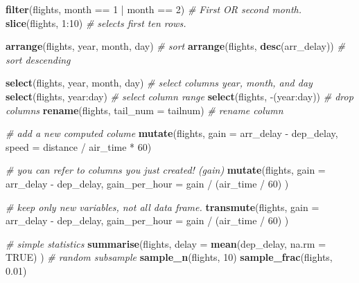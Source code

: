 \documentclass[]{book}
\newenvironment{Shaded}{\begin{snugshade}}{\end{snugshade}}
\newcommand{\KeywordTok}[1]{\textcolor[rgb]{0.13,0.29,0.53}{\textbf{{#1}}}}
\newcommand{\DataTypeTok}[1]{\textcolor[rgb]{0.13,0.29,0.53}{{#1}}}
\newcommand{\DecValTok}[1]{\textcolor[rgb]{0.00,0.00,0.81}{{#1}}}
\newcommand{\FloatTok}[1]{\textcolor[rgb]{0.00,0.00,0.81}{{#1}}}
\newcommand{\StringTok}[1]{\textcolor[rgb]{0.31,0.60,0.02}{{#1}}}
\newcommand{\CommentTok}[1]{\textcolor[rgb]{0.56,0.35,0.01}{\textit{{#1}}}}
\newcommand{\OtherTok}[1]{\textcolor[rgb]{0.56,0.35,0.01}{{#1}}}
\newcommand{\NormalTok}[1]{{#1}}
\theoremstyle{definition}
\theoremstyle{definition}
\theoremstyle{remark}
\begin{document}
\begin{Shaded}
\begin{Highlighting}[]
\KeywordTok{filter}\NormalTok{(flights, month ==}\StringTok{ }\DecValTok{1} \NormalTok{|}\StringTok{ }\NormalTok{month ==}\StringTok{ }\DecValTok{2}\NormalTok{) }\CommentTok{# First OR second month.}
\KeywordTok{slice}\NormalTok{(flights, }\DecValTok{1}\NormalTok{:}\DecValTok{10}\NormalTok{) }\CommentTok{# selects first ten rows.}

\KeywordTok{arrange}\NormalTok{(flights, year, month, day) }\CommentTok{# sort}
\KeywordTok{arrange}\NormalTok{(flights, }\KeywordTok{desc}\NormalTok{(arr_delay)) }\CommentTok{# sort descending}

\KeywordTok{select}\NormalTok{(flights, year, month, day) }\CommentTok{# select columns year, month, and day}
\KeywordTok{select}\NormalTok{(flights, year:day) }\CommentTok{# select column range}
\KeywordTok{select}\NormalTok{(flights, -(year:day)) }\CommentTok{# drop columns}
\KeywordTok{rename}\NormalTok{(flights, }\DataTypeTok{tail_num =} \NormalTok{tailnum) }\CommentTok{# rename column}

\CommentTok{# add a new computed colume}
\KeywordTok{mutate}\NormalTok{(flights,}
  \DataTypeTok{gain =} \NormalTok{arr_delay -}\StringTok{ }\NormalTok{dep_delay,}
  \DataTypeTok{speed =} \NormalTok{distance /}\StringTok{ }\NormalTok{air_time *}\StringTok{ }\DecValTok{60}\NormalTok{) }

\CommentTok{# you can refer to columns you just created! (gain)}
\KeywordTok{mutate}\NormalTok{(flights,}
  \DataTypeTok{gain =} \NormalTok{arr_delay -}\StringTok{ }\NormalTok{dep_delay,}
  \DataTypeTok{gain_per_hour =} \NormalTok{gain /}\StringTok{ }\NormalTok{(air_time /}\StringTok{ }\DecValTok{60}\NormalTok{)}
\NormalTok{)}

\CommentTok{# keep only new variables, not all data frame.}
\KeywordTok{transmute}\NormalTok{(flights,}
  \DataTypeTok{gain =} \NormalTok{arr_delay -}\StringTok{ }\NormalTok{dep_delay,}
  \DataTypeTok{gain_per_hour =} \NormalTok{gain /}\StringTok{ }\NormalTok{(air_time /}\StringTok{ }\DecValTok{60}\NormalTok{)}
\NormalTok{)}

\CommentTok{# simple statistics}
\KeywordTok{summarise}\NormalTok{(flights,}
  \DataTypeTok{delay =} \KeywordTok{mean}\NormalTok{(dep_delay, }\DataTypeTok{na.rm =} \OtherTok{TRUE}\NormalTok{)}
  \NormalTok{)}
\CommentTok{# random subsample }
\KeywordTok{sample_n}\NormalTok{(flights, }\DecValTok{10}\NormalTok{) }
\KeywordTok{sample_frac}\NormalTok{(flights, }\FloatTok{0.01}\NormalTok{) }
\end{Highlighting}
\end{Shaded}
\end{document}
